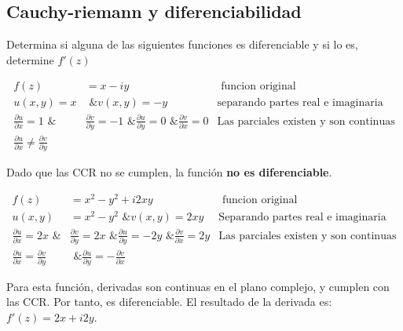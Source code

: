 \subsection{Cauchy-riemann y diferenciabilidad}

Determina si alguna de las siguientes funciones es diferenciable y si lo es, determine \( f'(z) \)

\begin{align}
    f(z) &= x - iy & \text{ funcion original } \nonumber \\
    u(x, y) = x &\text{ \& } v(x, y) = -y
        & \text{separando partes real e imaginaria} \nonumber \\
    \frac{\partial u}{\partial x}=1 \text{ \& } 
        &\frac{\partial v}{\partial y}=-1 \text{ \& }
        \frac{\partial u}{\partial y}=0 \text{ \& }
        \frac{\partial v}{\partial x}=0
        & \text{Las parciales existen y son continuas}
        \nonumber \\
    \frac{\partial u}{\partial x}\neq\frac{\partial v}{\partial y}
        & & \nonumber
\end{align}

Dado que las CCR no se cumplen, la función \textbf{no es diferenciable}.

\begin{align}
    f(z) &= x^2 - y^2 + i2xy & \text{ funcion original } \nonumber \\
    u(x, y) &= x^2 - y^2 \text{  \&  } v(x, y) = 2xy
        & \text{Separando partes real e imaginaria} \nonumber \\
    \frac{\partial u}{\partial x}=2x \text{ \& } 
        &\frac{\partial v}{\partial y}=2x \text{ \& }
        \frac{\partial u}{\partial y}=-2y \text{ \& }
        \frac{\partial v}{\partial x}=2y
        & \text{Las parciales existen y son continuas}
        \nonumber \\
    \frac{\partial u}{\partial x}=\frac{\partial v}{\partial y}
        & \text{ \& } \frac{\partial u}{\partial y} = -\frac{\partial v}{\partial x} & \nonumber
\end{align}

Para esta función, derivadas son continuas en el plano complejo, y cumplen con las CCR. Por tanto, es diferenciable. El resultado de la derivada es: \( f'(z) = 2x + i2y \).